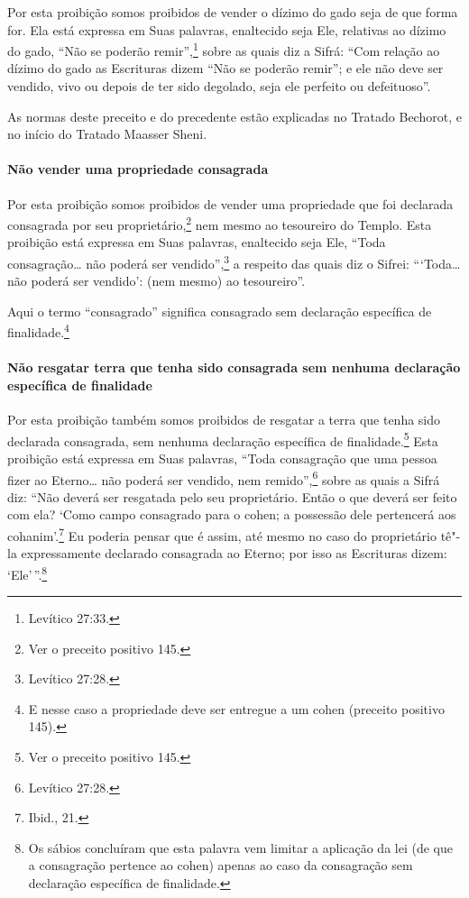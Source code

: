 \begin{multicols}{2}
Por esta proibição somos proibidos de vender o dízimo do gado seja de
que forma for. Ela está expressa em Suas palavras, enaltecido seja Ele,
relativas ao dízimo do gado, ``Não se poderão remir'',\footnote{Levítico 27:33.}
sobre as quais diz a Sifrá\starr: ``Com relação ao dízimo do gado as
Escrituras dizem ``Não se poderão remir''; e ele não deve ser vendido,
vivo ou depois de ter sido degolado, seja ele perfeito ou defeituoso''.

As normas deste preceito e do precedente estão explicadas no Tratado
Bechorot\starr, e no início do Tratado Maasser Sheni\starr.

\paragraph{Não vender uma propriedade consagrada}

Por esta proibição somos proibidos de vender uma propriedade que foi
declarada consagrada por seu proprietário,\footnote{Ver o preceito positivo 145.} nem
mesmo ao tesoureiro do Templo. Esta proibição está expressa em Suas
palavras, enaltecido seja Ele,
``Toda consagração\ldots{} não poderá ser vendido'',\footnote{Levítico 27:28.} a
respeito das quais diz o Sifrei\starr: ```Toda\ldots{} não poderá ser vendido':
(nem mesmo) ao tesoureiro''.

Aqui o termo ``consagrado'' significa consagrado sem declaração
específica de finalidade.\footnote{E nesse caso a propriedade deve ser entregue a um cohen\starr{} (preceito positivo 145).}

\paragraph{Não resgatar terra que tenha sido consagrada sem nenhuma declaração
específica de finalidade}

Por esta proibição também somos proibidos de resgatar a terra que tenha
sido declarada consagrada, sem nenhuma declaração específica de
finalidade.\footnote{Ver o preceito positivo 145.} Esta proibição está expressa em Suas
palavras, ``Toda consagração que uma pessoa fizer ao Eterno\ldots{} não
poderá ser vendido, nem remido'',\footnote{Levítico 27:28.} sobre as quais a
Sifrá\starr{} diz: ``Não deverá ser resgatada pelo seu proprietário. Então o que
deverá ser feito com ela? `Como campo consagrado para o cohen\starr; a
possessão dele pertencerá aos cohanim\starr'.\footnote{Ibid., 21.} Eu poderia pensar
que é assim, até mesmo no caso do proprietário tê"-la expressamente
declarado consagrada ao Eterno; por isso as Escrituras dizem:
`Ele'\,''.\footnote{Os sábios concluíram que esta palavra vem limitar a aplicação da
lei (de que a consagração pertence ao cohen\starr) apenas ao caso da
consagração sem declaração específica de finalidade.}


\end{multicols}
